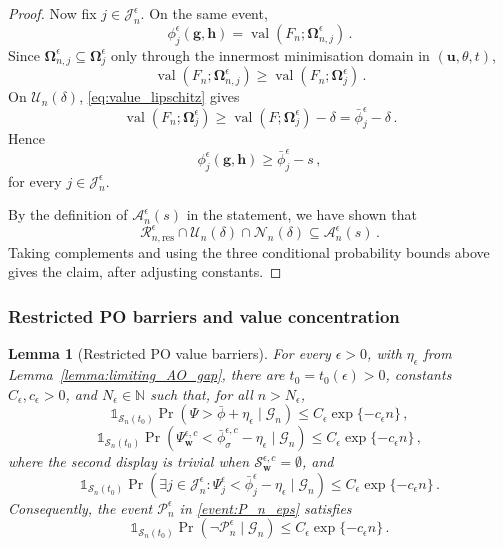 \documentclass{article}
\newtheorem{lemma}{Lemma}
\theoremstyle{definition}
\newcommand*{\bb}{\boldsymbol}
\def\bw {\bb{w}}
\def\bu{\bb{u}}
\def\bh{\bb{h}}
\def\bg{\bb{g}}
\begin{document}
\begin{bibunit}
\begin{proof}
Now fix $j\in\mathcal J_n^\epsilon$. On the same event,
	$$
		\phi_j^\epsilon(\bg,\bh)
		=
		\operatorname{val}
		\left(
			F_n;
			\bb\Omega_{n,j}^{\epsilon}
		\right) \,.
	$$
	Since $\bb\Omega_{n,j}^{\epsilon} \subseteq \bb\Omega_j^\epsilon$
	only through the innermost minimisation domain in $(\bu,\theta,t)$,
	$$
		\operatorname{val}
		\left(
			F_n;
			\bb\Omega_{n,j}^{\epsilon}
		\right)
		\ge
		\operatorname{val}
		\left(
			F_n;
			\bb\Omega_j^\epsilon
		\right) \,.
	$$
	On $\mathcal U_n(\delta)$, \eqref{eq:value_lipschitz} gives
	$$
		\operatorname{val}
		\left(
			F_n;
			\bb\Omega_j^\epsilon
		\right)
		\ge
		\operatorname{val}
		\left(
			F;
			\bb\Omega_j^\epsilon
		\right)
		-
		\delta
		=
		\bar\phi_j^\epsilon-\delta\,.
	$$
	Hence
	$$
		\phi_j^\epsilon(\bg,\bh)
		\ge
		\bar\phi_j^\epsilon-s\,,
		$$
	for every $j\in\mathcal J_n^\epsilon$.

	By the definition of $\mathcal A_n^\epsilon(s)$ in the statement,
	we have shown that
	$$
		\mathcal R_{n,\mathrm{res}}^\epsilon
		\cap
		\mathcal U_n(\delta)
		\cap
		\mathcal N_n(\delta)
		\subseteq
		\mathcal A_n^\epsilon(s)\,.
	$$
	Taking complements and using the three conditional probability bounds
	above gives the claim, after adjusting constants.
\end{proof}

\subsubsection{Restricted PO barriers and value concentration}

\begin{lemma}[Restricted PO value barriers]
\label{lemma:restricted_PO_value_barriers}
For every $\epsilon>0$, with $\eta_\epsilon$ from
Lemma~\ref{lemma:limiting_AO_gap}, there are $t_0=t_0(\epsilon)>0$,
constants $C_\epsilon,c_\epsilon>0$, and $N_\epsilon\in\mathbb N$ such
that, for all $n>N_\epsilon$,
$$
    \mathds{1}_{\mathcal S_n(t_0)}
    \Pr\left(
        \Psi>\bar\phi+\eta_\epsilon
        \mid
        \mathcal G_n
    \right)
    \leq
    C_\epsilon\exp\{-c_\epsilon n\}\,,
$$
$$
    \mathds{1}_{\mathcal S_n(t_0)}
    \Pr\left(
        \Psi_{\bw}^{\epsilon,c}
        <
        \bar\phi_{\sigma}^{\epsilon,c}-\eta_\epsilon
        \mid
        \mathcal G_n
    \right)
    \leq
    C_\epsilon\exp\{-c_\epsilon n\}\,,
$$
where the second display is trivial when
$\mathcal S_{\bw}^{\epsilon,c}=\emptyset$, and
$$
    \mathds{1}_{\mathcal S_n(t_0)}
    \Pr\left(
        \exists j\in\mathcal J_n^\epsilon:
        \Psi_j^\epsilon
        <
        \bar\phi_j^\epsilon-\eta_\epsilon
        \mid
        \mathcal G_n
    \right)
    \leq
    C_\epsilon\exp\{-c_\epsilon n\} \,.
$$
Consequently, the event $\mathcal P_n^\epsilon$ in
\eqref{event:P_n_eps} satisfies
$$
    \mathds{1}_{\mathcal S_n(t_0)}
    \Pr\left(
        \lnot\mathcal P_n^\epsilon
        \mid
        \mathcal G_n
    \right)
    \leq
    C_\epsilon\exp\{-c_\epsilon n\} \,.
$$
\end{lemma}


\end{bibunit}
\end{document}
